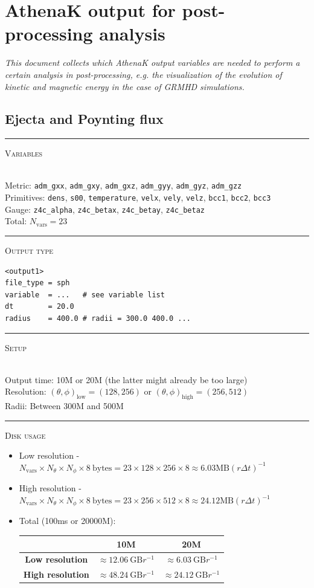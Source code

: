 \documentclass{article}
\newcommand{\var}[1]{%
  {\setlength{\fboxsep}{1.5pt}%
   \colorbox{varbg}{\textcolor{varfg}{\texttt{\small #1}}}}}
\newcommand{\step}[1]{%
  \par\medskip\noindent
  {\color{stepfg}\rule[-0.15ex]{2pt}{1.5ex}\hspace{0.5em}\scshape #1}%
  \hspace{0.75em}\ignorespaces}
\begin{document}
\section*{AthenaK output for post-processing analysis}
\textit{This document collects which AthenaK output variables are needed to perform
a certain analysis in post-processing, e.g. the visualization of the evolution of kinetic
and magnetic energy in the case of GRMHD simulations.}

\medskip

\noindent
\subsection*{Ejecta and Poynting flux}
\step{Variables}\mbox{}\\
Metric: \var{adm\_gxx}, \var{adm\_gxy}, \var{adm\_gxz}, \var{adm\_gyy}, \var{adm\_gyz}, \var{adm\_gzz}\\
Primitives: \var{dens}, \var{s00}, \var{temperature}, \var{velx}, \var{vely}, \var{velz}, \var{bcc1}, \var{bcc2}, \var{bcc3}\\
Gauge: \var{z4c\_alpha}, \var{z4c\_betax}, \var{z4c\_betay}, \var{z4c\_betaz}\\
Total: $\boxed{N_{\mathrm{vars}}=23}$

\step{Output type}
\begin{verbatim}
<output1>
file_type = sph
variable  = ...   # see variable list
dt        = 20.0
radius    = 400.0 # radii = 300.0 400.0 ...
\end{verbatim}

\step{Setup}\mbox{}\\
Output time: 10M or 20M (the latter might already be too large)\\
Resolution: $(\theta,\phi)_{\mathrm{low}}=(128,256)$ or  $(\theta,\phi)_{\mathrm{high}}=(256,512)$\\
Radii: Between 300M and 500M

\step{Disk usage}
\begin{itemize}
  \item Low resolution - $N_{\mathrm{vars}}\times N_{\theta}\times N_{\phi}\times 8\ \mathrm{bytes}=23\times128\times256\times8\approx \boxed{6.03\mathrm{MB}(r\Delta t)^{-1}}$
  \item High resolution - $N_{\mathrm{vars}}\times N_{\theta}\times N_{\phi}\times 8\ \mathrm{bytes}=23\times256\times512\times8\approx \boxed{24.12\mathrm{MB}(r\Delta t)^{-1}}$
  \item Total (100ms or 20000M):
  \begin{raggedleft}
    \begin{tabular}{|c|c|c|}
      \hline
      &\textbf{10M}&\textbf{20M}\\
      \hline
      \textbf{Low resolution}&$\approx 12.06\ \mathrm{GB}r^{-1}$&$\approx 6.03\ \mathrm{GB}r^{-1}$\\
      \hline
      \textbf{High resolution}&$\approx 48.24\ \mathrm{GB}r^{-1}$&$\approx 24.12\ \mathrm{GB}r^{-1}$\\
      \hline
    \end{tabular}
  \end{raggedleft}
\end{itemize}
\end{document}
